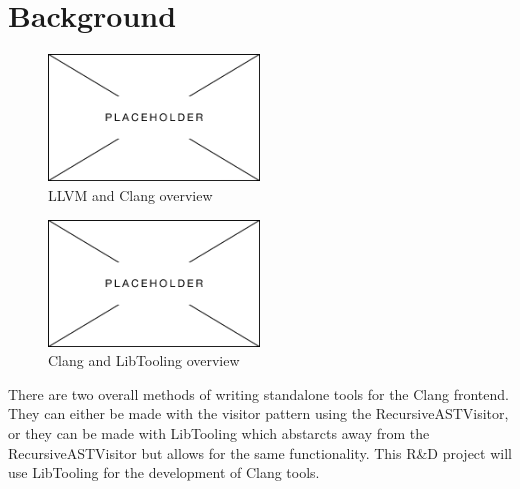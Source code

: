 \chapter{Background}

\begin{figure}[H]
    \centering
    \includegraphics[width=0.5\textwidth]{figs/030bac/placeholder.png}
    \caption{LLVM and Clang overview}
    \label{fig:030bac:llvmToolchainOverview}
\end{figure}

\begin{figure}[H]
    \centering
    \includegraphics[width=0.5\textwidth]{figs/030bac/placeholder.png}
    \caption{Clang and LibTooling overview}
    \label{fig:030bac:clangToolingOverview}
\end{figure}


There are two overall methods of writing standalone tools for the Clang frontend. They can either be made with the visitor pattern using the RecursiveASTVisitor, or they can be made with LibTooling which abstarcts away from the RecursiveASTVisitor but allows for the same functionality. This R\&D project will use LibTooling for the development of Clang tools.\cite{HowWriteRecursiveASTVisitor,LibToolingClang17}